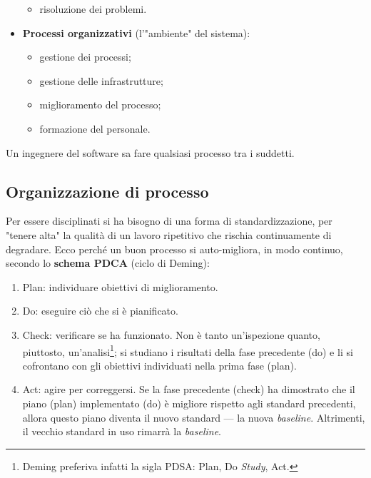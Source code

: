 \documentclass[a4paper]{article}
\begin{document}
\begin{itemize}
\begin{itemize}
	\item risoluzione dei problemi.
				
	\end{itemize}

			
			
	\item \textbf{Processi organizzativi} (l'"ambiente" del sistema):
				
	\begin{itemize}
		
					
	\item gestione dei processi;
					
	\item gestione delle infrastrutture;
					
	\item miglioramento del processo;
					
	\item formazione del personale.
				
	\end{itemize}

			
		
	\end{itemize}

		
Un ingegnere del software sa fare qualsiasi processo tra i suddetti.

		
	\subsection{Organizzazione di processo}

		
Per essere disciplinati si ha bisogno di una forma di standardizzazione, per "tenere alta" la qualità di un lavoro ripetitivo che rischia continuamente di degradare. Ecco perché un buon processo si auto-migliora, in modo continuo, secondo lo \textbf{schema PDCA} (ciclo di Deming):
		
	\begin{enumerate}
		
			
	\item Plan: individuare obiettivi di miglioramento.
			
	\item Do: eseguire ciò che si è pianificato.
			
	\item Check: verificare se ha funzionato. Non è tanto un'ispezione quanto, piuttosto, un'analisi\footnote{Deming preferiva infatti la sigla PDSA: Plan, Do \emph{Study}, Act.}; si studiano i risultati della fase precedente (do) e li si cofrontano con gli obiettivi individuati nella prima fase (plan).
			
	\item Act: agire per correggersi. Se la fase precedente (check) ha dimostrato che il piano (plan) implementato (do) è migliore rispetto agli standard precedenti, allora questo piano diventa il nuovo standard --- la nuova \emph{baseline}. Altrimenti, il vecchio standard in uso rimarrà la \emph{baseline}.
		
	\end{enumerate}
\end{document}
